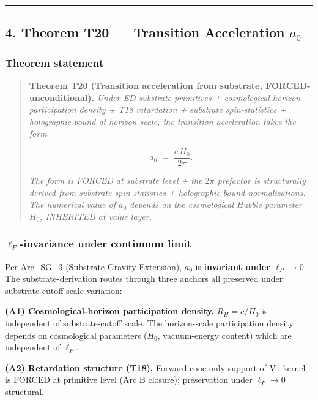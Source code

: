 \documentclass[
  11pt,a4paper]{article}
\begin{document}
\begin{center}\rule{0.5\linewidth}{0.5pt}\end{center}

\subsection{\texorpdfstring{4. Theorem T20 --- Transition Acceleration
\(a_0\)}{4. Theorem T20 --- Transition Acceleration a\_0}}\label{theorem-t20-transition-acceleration-a_0}

\subsubsection{Theorem statement}\label{theorem-statement-1}

\begin{quote}
\textbf{Theorem T20 (Transition acceleration from substrate,
FORCED-unconditional).} \emph{Under ED substrate primitives +
cosmological-horizon participation density + T18 retardation + substrate
spin-statistics + holographic bound at horizon scale, the transition
acceleration takes the form}

\[a_0 \;=\; \frac{c\,H_0}{2\pi}.\]

\emph{The form is FORCED at substrate level + the \(2\pi\) prefactor is
structurally derived from substrate spin-statistics + holographic-bound
normalizations. The numerical value of \(a_0\) depends on the
cosmological Hubble parameter \(H_0\), INHERITED at value layer.}
\end{quote}

\subsubsection{\texorpdfstring{\(\ell_P\)-invariance under continuum
limit}{\textbackslash ell\_P-invariance under continuum limit}}\label{ell_p-invariance-under-continuum-limit}

Per Arc\_SG\_3 (Substrate Gravity Extension), \(a_0\) is
\textbf{invariant under \(\ell_P \to 0\)}. The substrate-derivation
routes through three anchors all preserved under substrate-cutoff scale
variation:

\textbf{(A1) Cosmological-horizon participation density.}
\(R_H = c/H_0\) is independent of substrate-cutoff scale. The
horizon-scale participation density depends on cosmological parameters
(\(H_0\), vacuum-energy content) which are independent of \(\ell_P\).

\textbf{(A2) Retardation structure (T18).} Forward-cone-only support of
V1 kernel is FORCED at primitive level (Arc B closure); preservation
under \(\ell_P \to 0\) structural.
\end{document}
